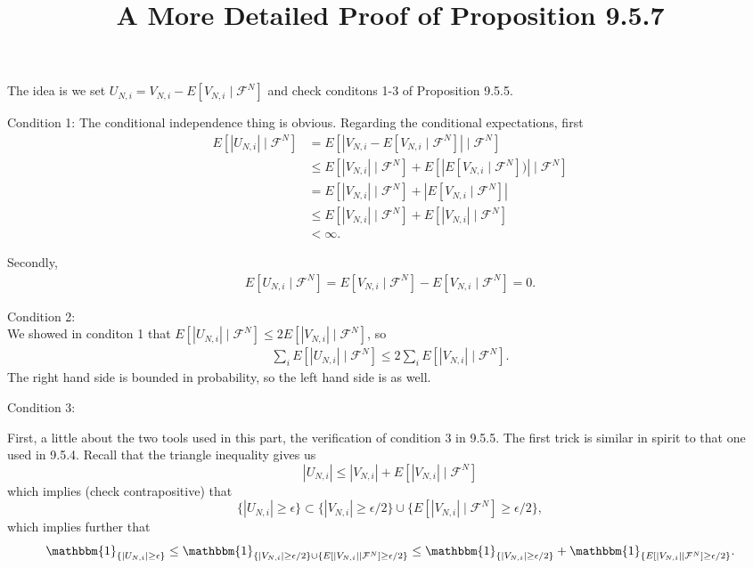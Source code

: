 \documentclass{article}
\title{A More Detailed Proof of Proposition 9.5.7}
\begin{document}
\maketitle

The idea is we set $U_{N,i} = V_{N,i} - E[V_{N,i} \mid \mathcal{F}^N]$ and check conditons 1-3 of Proposition 9.5.5.
\newline

Condition 1: 
The conditional independence thing is obvious. Regarding the conditional expectations, first
\begin{align*}
E[|U_{N,i}| \mid \mathcal{F}^N] &= E[| V_{N,i} - E[V_{N,i} \mid \mathcal{F}^N] | \mid \mathcal{F}^N] \\
&\le E[| V_{N,i} | \mid \mathcal{F}^N] + E[ | E[V_{N,i} \mid \mathcal{F}^N]) | \mid \mathcal{F}^N] \tag{tri- ineq and linearity} \\
&= E[| V_{N,i} | \mid \mathcal{F}^N] + | E[V_{N,i} \mid \mathcal{F}^N]  | \\
&\le E[| V_{N,i} | \mid \mathcal{F}^N] +  E[ | V_{N,i}| \mid \mathcal{F}^N] \tag{Jensen's} \\
&< \infty \tag{assumption i}.
\end{align*}

Secondly,
\begin{eqnarray}
E[U_{N,i} \mid \mathcal{F}^N] = E[ V_{N,i} \mid \mathcal{F}^N] - E[V_{N,i} \mid \mathcal{F}^N] =0.
\end{eqnarray}

Condition 2: \\
We showed in conditon 1 that $E[|U_{N,i}| \mid \mathcal{F}^N] \le 2E[| V_{N,i} | \mid \mathcal{F}^N]$, so
\begin{eqnarray}
\sum_i E[|U_{N,i}| \mid \mathcal{F}^N] \le 2 \sum_i E[| V_{N,i} | \mid \mathcal{F}^N].
\end{eqnarray}
The right hand side is bounded in probability, so the left hand side is as well.
\newline


Condition 3: 

First, a little about the two tools used in this part, the verification of condition 3 in 9.5.5. The first trick is similar in spirit to that one used in 9.5.4. Recall that the triangle inequality gives us
\[
|U_{N,i}| \le |V_{N,i}| + E[|V_{N,i}| \mid \mathcal{F}^N]
\]
which implies (check contrapositive) that 
\[
\{ |U_{N,i}| \ge \epsilon\} \subset \{ |V_{N,i}| \ge \epsilon/2  \} \cup \{ E[|V_{N,i}| \mid \mathcal{F}^N] \ge \epsilon/2 \},
\]
which implies further that
\[
\mathbbm{1}_{\{ |U_{N,i}| \ge \epsilon\}} \le \mathbbm{1}_{\{ |V_{N,i}| \ge \epsilon/2  \} \cup \{ E[|V_{N,i}| \mid \mathcal{F}^N] \ge \epsilon/2 \}} \le \mathbbm{1}_{ \{ |V_{N,i}| \ge \epsilon/2  \}  } + \mathbbm{1}_{  \{ E[|V_{N,i}| \mid \mathcal{F}^N] \ge \epsilon/2 \}  }.
\]
\end{document}
